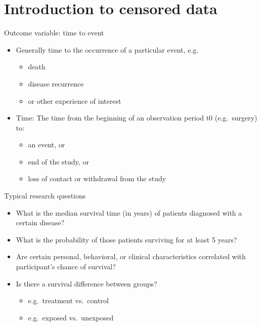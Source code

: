 \documentclass[
  ignorenonframetext,
]{beamer}
\providecommand{\tightlist}{%
  \setlength{\itemsep}{0pt}\setlength{\parskip}{0pt}}
\begin{document}
\hypertarget{introduction-to-censored-data}{%
\section{Introduction to censored
data}\label{introduction-to-censored-data}}

\begin{frame}{Outcome variable: time to event}
\protect\hypertarget{outcome-variable-time-to-event}{}

\begin{itemize}
\tightlist
\item
  Generally time to the occurrence of a particular event, e.g.~

  \begin{itemize}
  \tightlist
  \item
    death
  \item
    disease recurrence
  \item
    or other experience of interest
  \end{itemize}
\item
  Time: The time from the beginning of an observation period t0
  (e.g.~surgery) to:

  \begin{itemize}
  \tightlist
  \item
    an event, or
  \item
    end of the study, or
  \item
    loss of contact or withdrawal from the study
  \end{itemize}
\end{itemize}

\end{frame}

\begin{frame}{Typical research questions}
\protect\hypertarget{typical-research-questions}{}

\begin{itemize}
\tightlist
\item
  What is the median survival time (in years) of patients diagnosed with
  a certain disease?
\item
  What is the probability of those patients surviving for at least 5
  years?
\item
  Are certain personal, behavioral, or clinical characteristics
  correlated with participant's chance of survival?
\item
  Is there a survival difference between groups?

  \begin{itemize}
  \tightlist
  \item
    e.g.~treatment vs.~control
  \item
    e.g.~exposed vs.~unexposed
  \end{itemize}
\end{itemize}

\end{frame}
\end{document}

